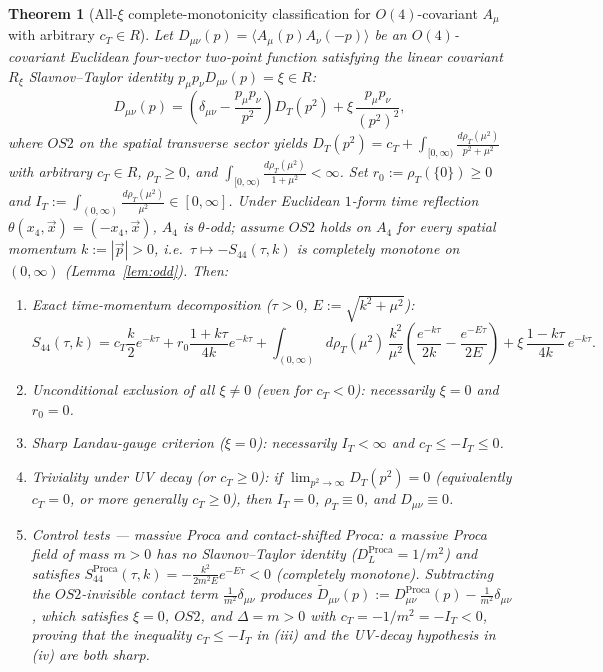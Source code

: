 \documentclass[11pt,a4paper]{article}
\def\R{R}\def\N{N}\def\Q{Q}\def\Z{Z}\def\Class{C}\def\OS{OS}\def\Gap{Gap}%
\theoremstyle{plain}
\newtheorem{theorem}{Theorem}[section]
\theoremstyle{definition}
\theoremstyle{remark}
\newcommand{\R}{\mathbb{R}}\newcommand{\N}{\mathbb{N}}\newcommand{\Q}{\mathbb{Q}}
\newcommand{\Z}{\mathbb{Z}}\newcommand{\Spec}{\operatorname{Spec}}
\newcommand{\OS}{\mathrm{OS}}\newcommand{\Gap}{\mathrm{Gap}}
\newcommand{\Class}{\mathcal{C}}\newcommand{\Htot}{\mathcal{H}}
\renewcommand{\_}{\oldunderscore\allowbreak}
\begin{document}
\begin{theorem}[All-$\xi$ complete-monotonicity classification for $O(4)$-covariant $A_\mu$ with arbitrary $c_T\in\R$]\label{thm:covA4}
Let $D_{\mu\nu}(p)=\langle A_\mu(p)A_\nu(-p)\rangle$ be an $O(4)$-covariant Euclidean four-vector two-point function satisfying the linear covariant $R_\xi$ Slavnov--Taylor identity $p_\mu p_\nu D_{\mu\nu}(p)=\xi\in\R$:
\[
D_{\mu\nu}(p)=\left(\delta_{\mu\nu}-\frac{p_\mu p_\nu}{p^2}\right)D_T(p^2)+\xi\,\frac{p_\mu p_\nu}{(p^2)^2},
\]
where $\OS2$ on the spatial transverse sector yields $D_T(p^2)=c_T+\int_{[0,\infty)}\frac{d\rho_T(\mu^2)}{p^2+\mu^2}$ with \emph{arbitrary} $c_T\in\R$, $\rho_T\ge0$, and $\int_{[0,\infty)}\frac{d\rho_T(\mu^2)}{1+\mu^2}<\infty$. Set $r_0:=\rho_T(\{0\})\ge0$ and $I_T:=\int_{(0,\infty)}\frac{d\rho_T(\mu^2)}{\mu^2}\in[0,\infty]$. Under Euclidean $1$-form time reflection $\theta(x_4,\vec x)=(-x_4,\vec x)$, $A_4$ is $\theta$-odd; assume $\OS2$ holds on $A_4$ for every spatial momentum $k:=|\vec p|>0$, i.e.\ $\tau\mapsto -S_{44}(\tau,k)$ is completely monotone on $(0,\infty)$ (Lemma~\ref{lem:odd}). Then:
\begin{enumerate}[label=(\roman*),leftmargin=22pt,itemsep=1pt]
\item \emph{Exact time-momentum decomposition ($\tau>0$, $E:=\sqrt{k^2+\mu^2}$):}
\[
S_{44}(\tau,k)=c_T\frac{k}{2}e^{-k\tau}+r_0\frac{1+k\tau}{4k}e^{-k\tau}+\int_{(0,\infty)} d\rho_T(\mu^2)\,\frac{k^2}{\mu^2}\!\left(\frac{e^{-k\tau}}{2k}-\frac{e^{-E\tau}}{2E}\right)+\xi\,\frac{1-k\tau}{4k}\,e^{-k\tau}.
\]
\item \emph{Unconditional exclusion of all $\xi\neq0$ (even for $c_T<0$):} necessarily $\xi=0$ and $r_0=0$.
\item \emph{Sharp Landau-gauge criterion ($\xi=0$):} necessarily $I_T<\infty$ and $c_T\le -I_T\le 0$.
\item \emph{Triviality under UV decay (or $c_T\ge0$):} if $\lim_{p^2\to\infty}D_T(p^2)=0$ (equivalently $c_T=0$, or more generally $c_T\ge0$), then $I_T=0$, $\rho_T\equiv0$, and $D_{\mu\nu}\equiv0$.
\item \emph{Control tests --- massive Proca and contact-shifted Proca:} a massive Proca field of mass $m>0$ has no Slavnov--Taylor identity ($D_L^{\mathrm{Proca}}=1/m^2$) and satisfies $S_{44}^{\mathrm{Proca}}(\tau,k)=-\frac{k^2}{2m^2E}e^{-E\tau}<0$ (completely monotone). Subtracting the $\OS2$-invisible contact term $\frac{1}{m^2}\delta_{\mu\nu}$ produces $\widetilde{D}_{\mu\nu}(p):=D_{\mu\nu}^{\mathrm{Proca}}(p)-\frac{1}{m^2}\delta_{\mu\nu}$, which satisfies $\xi=0$, $\OS2$, and $\Delta=m>0$ with $c_T=-1/m^2=-I_T<0$, proving that the inequality $c_T\le -I_T$ in (iii) and the UV-decay hypothesis in (iv) are both \emph{sharp}.
\end{enumerate}
\end{theorem}
\end{document}
